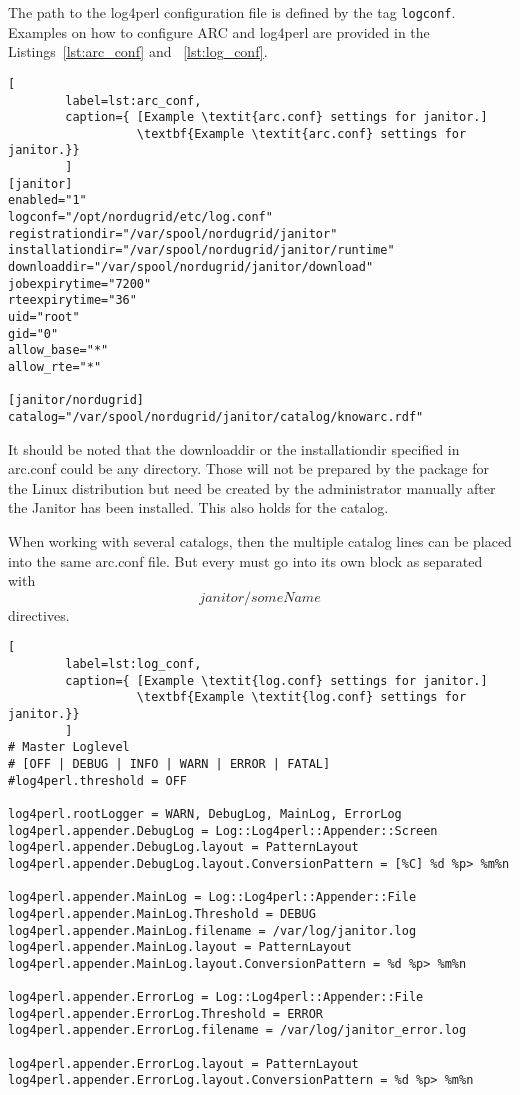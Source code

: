 The path to the log4perl configuration file is defined by the tag
\texttt{logconf}.  Examples on how to configure ARC and log4perl are
provided in the Listings~\ref{lst:arc_conf} and ~\ref{lst:log_conf}.


\begin{lstlisting}[
        label=lst:arc_conf,
        caption={ [Example \textit{arc.conf} settings for janitor.]
                  \textbf{Example \textit{arc.conf} settings for janitor.}}
        ]
[janitor]
enabled="1"
logconf="/opt/nordugrid/etc/log.conf"
registrationdir="/var/spool/nordugrid/janitor"
installationdir="/var/spool/nordugrid/janitor/runtime"
downloaddir="/var/spool/nordugrid/janitor/download"
jobexpirytime="7200"
rteexpirytime="36"
uid="root"
gid="0"
allow_base="*"
allow_rte="*"

[janitor/nordugrid]
catalog="/var/spool/nordugrid/janitor/catalog/knowarc.rdf"
\end{lstlisting}

It should be noted that the downloaddir or the installationdir specified
in arc.conf could be any directory. Those will not be prepared by the
package for the Linux distribution but need be created by the administrator
manually after the Janitor has been installed. This also holds for the
catalog.

When working with several catalogs, then the multiple catalog lines can
be placed into the same arc.conf file. But every must go into its own block
as separated with \[janitor/someName\] directives.

\begin{lstlisting}[
        label=lst:log_conf,
        caption={ [Example \textit{log.conf} settings for janitor.]
                  \textbf{Example \textit{log.conf} settings for janitor.}}
        ]
# Master Loglevel
# [OFF | DEBUG | INFO | WARN | ERROR | FATAL]
#log4perl.threshold = OFF

log4perl.rootLogger = WARN, DebugLog, MainLog, ErrorLog
log4perl.appender.DebugLog = Log::Log4perl::Appender::Screen
log4perl.appender.DebugLog.layout = PatternLayout
log4perl.appender.DebugLog.layout.ConversionPattern = [%C] %d %p> %m%n

log4perl.appender.MainLog = Log::Log4perl::Appender::File
log4perl.appender.MainLog.Threshold = DEBUG
log4perl.appender.MainLog.filename = /var/log/janitor.log
log4perl.appender.MainLog.layout = PatternLayout
log4perl.appender.MainLog.layout.ConversionPattern = %d %p> %m%n

log4perl.appender.ErrorLog = Log::Log4perl::Appender::File
log4perl.appender.ErrorLog.Threshold = ERROR
log4perl.appender.ErrorLog.filename = /var/log/janitor_error.log

log4perl.appender.ErrorLog.layout = PatternLayout
log4perl.appender.ErrorLog.layout.ConversionPattern = %d %p> %m%n
\end{lstlisting}


